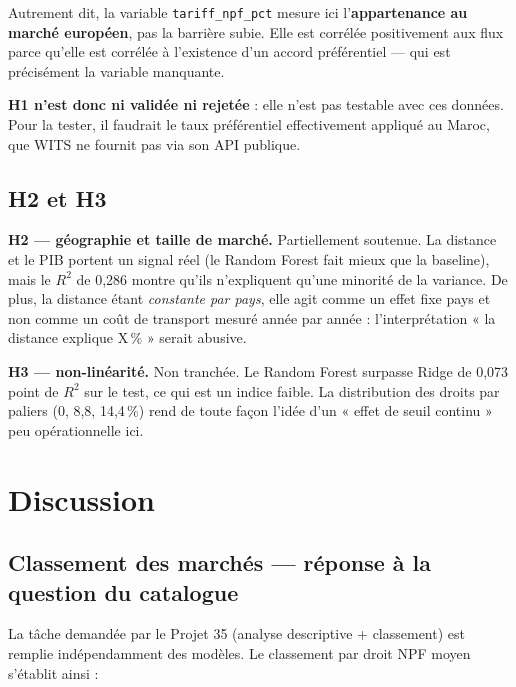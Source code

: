 \documentclass[11pt,a4paper]{article}
\begin{document}
Autrement dit, la variable \texttt{tariff\_npf\_pct} mesure ici
l'\textbf{appartenance au marché européen}, pas la barrière subie. Elle est corrélée
positivement aux flux parce qu'elle est corrélée à l'existence d'un accord
préférentiel — qui est précisément la variable manquante.

\textbf{H1 n'est donc ni validée ni rejetée} : elle n'est pas testable avec ces
données. Pour la tester, il faudrait le taux préférentiel effectivement appliqué au
Maroc, que WITS ne fournit pas via son API publique.

\subsection{H2 et H3}

\textbf{H2 — géographie et taille de marché.} Partiellement soutenue. La distance et
le PIB portent un signal réel (le Random Forest fait mieux que la baseline), mais le
$R^2$ de 0,286 montre qu'ils n'expliquent qu'une minorité de la variance. De plus,
la distance étant \emph{constante par pays}, elle agit comme un effet fixe pays et non
comme un coût de transport mesuré année par année : l'interprétation « la distance
explique X\,\% » serait abusive.

\textbf{H3 — non-linéarité.} Non tranchée. Le Random Forest surpasse Ridge de
0,073 point de $R^2$ sur le test, ce qui est un indice faible. La distribution des
droits par paliers (0, 8,8, 14,4\,\%) rend de toute façon l'idée d'un « effet de
seuil continu » peu opérationnelle ici.

\section{Discussion}\label{sec:discussion}

\subsection{Classement des marchés — réponse à la question du catalogue}

La tâche demandée par le Projet 35 (analyse descriptive + classement) est remplie
indépendamment des modèles. Le classement par droit NPF moyen s'établit ainsi :
\end{document}
